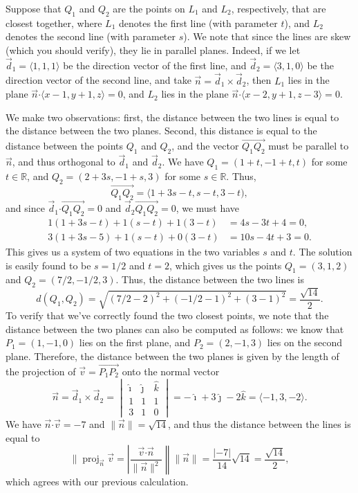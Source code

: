 \documentclass[letterpaper,12pt]{article}
\newcommand{\len}[1]{\lVert #1\rVert}
\newcommand{\abs}[1]{\lvert #1\rvert}
\newcommand{\R}{\mathbb{R}}
\newcommand{\dotp}{\boldsymbol{\cdot}}
\begin{document}
\begin{enumerate}
\bigskip

Suppose that $Q_1$ and $Q_2$ are the points on $L_1$ and $L_2$, respectively, that are closest together, where $L_1$ denotes the first line (with parameter $t$), and $L_2$ denotes the second line (with parameter $s$). We note that since the lines are skew (which you should verify), they lie in parallel planes. Indeed, if we let $\vec{d}_1 = \langle 1,1,1\rangle$ be the direction vector of the first line, and $\vec{d}_2 = \langle 3,1,0\rangle$ be the direction vector of the second line, and take $\vec{n} = \vec{d}_1\times\vec{d}_2$, then $L_1$ lies in the plane $\vec{n}\dotp \langle x-1,y+1,z\rangle=0$, and $L_2$ lies in the plane $\vec{n}\dotp\langle x-2,y+1,z-3\rangle=0$.

We make two observations: first, the distance between the two lines is equal to the distance between the two planes. Second, this distance is equal to the distance between the points $Q_1$ and $Q_2$, and the vector $\overrightarrow{Q_1Q_2}$ must be parallel to $\vec{n}$, and thus orthogonal to $\vec{d}_1$ and $\vec{d}_2$. We have $Q_1 = (1+t,-1+t,t)$ for some $t\in\R$, and $Q_2 = (2+3s,-1+s,3)$ for some $s\in\R$. Thus,
\[
\overrightarrow{Q_1Q_2}=\langle 1+3s-t,s-t,3-t),
\]
and since $\vec{d}_1\dotp \overrightarrow{Q_1Q_2}=0$ and $\vec{d}_2\overrightarrow{Q_1Q_2}=0$, we must have
\begin{align*}
1(1+3s-t)+1(s-t)+1(3-t) &= 4s-3t+4=0,\\
3(1+3s-5)+1(s-t)+0(3-t) &= 10s-4t+3=0.
\end{align*}
This gives us a system of two equations in the two variables $s$ and $t$. The solution is easily found to be $s=1/2$ and $t=2$, which gives us the points $Q_1=(3,1,2)$ and $Q_2=(7/2,-1/2,3)$. Thus, the distance between the two lines is
\[
d(Q_1,Q_2) = \sqrt{(7/2-2)^2+(-1/2-1)^2+(3-1)^2} = \frac{\sqrt{14}}{2}.
\]
To verify that we've correctly found the two closest points, we note that the distance between the two planes can also be computed as follows: we know that $P_1=(1,-1,0)$ lies on the first plane, and $P_2=(2,-1,3)$ lies on the second plane. Therefore, the distance between the two planes is given by the length of the projection of $\vec{v}=\overrightarrow{P_1P_2}$ onto the normal vector
\[
\vec{n}=\vec{d}_1\times\vec{d}_2 = \begin{vmatrix}
\hat{\imath}&\hat{\jmath}&\hat{k}\\1&1&1\\3&1&0
\end{vmatrix}=-\hat{\imath}+3\hat{\jmath}-2\hat{k}=\langle -1,3,-2\rangle.
\]
We have $\vec{n}\dotp\vec{v} = -7$ and $\len{\vec{n}}=\sqrt{14}$, and thus the distance between the lines is equal to
\[
\len{\operatorname{proj}_{\vec{n}}\vec{v} = \left|\frac{\vec{v}\dotp\vec{n}}{\len{\vec{n}}^2}\right}\len{\vec{n}} = \frac{\abs{-7}}{14}\sqrt{14} = \frac{\sqrt{14}}{2},
\]
which agrees with our previous calculation.
\end{enumerate}
\end{document}
